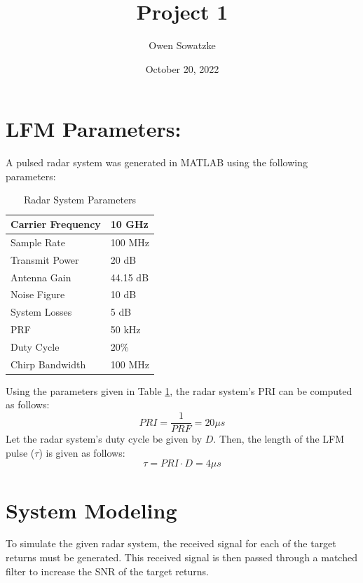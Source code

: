 \documentclass[12pt,letterpaper]{article}
\title{Project 1}
\author{Owen Sowatzke}
\date{October 20, 2022}
\begin{document}
\maketitle
\section{LFM Parameters:}
A pulsed radar system was generated in MATLAB using the following parameters:
\begin{table}[H]
\caption{Radar System Parameters}
\label{Parameter Table}
\begin{tabularx}{\textwidth}{| X | X |}
\hline
Carrier Frequency & 10 GHz \\
\hline
Sample Rate & 100 MHz \\
\hline
Transmit Power & 20 dB \\
\hline
Antenna Gain & 44.15 dB \\
\hline
Noise Figure & 10 dB \\
\hline 
System Losses & 5 dB \\
\hline
PRF & 50 kHz \\
\hline
Duty Cycle & 20\% \\
\hline
Chirp Bandwidth & 100 MHz \\
\hline
\end{tabularx}
\end{table}
\noindent
Using the parameters given in Table \ref{Parameter Table}, the radar system's PRI can be computed as follows:
\begin{equation}
PRI = \frac{1}{PRF} = 20 {\mu}s
\label{PRI Equation}
\end{equation}
Let the radar system's duty cycle be given by $D$. Then, the length of the LFM pulse ($\tau$) is given as follows:
\begin{equation}
\tau = PRI \cdot D = 4 {\mu}s
\label{tau equation}
\end{equation}
\section{System Modeling}
To simulate the given radar system, the received signal for each of the target returns must be generated. This received signal is then passed through a matched filter to increase the SNR of the target returns.
\end{document}
